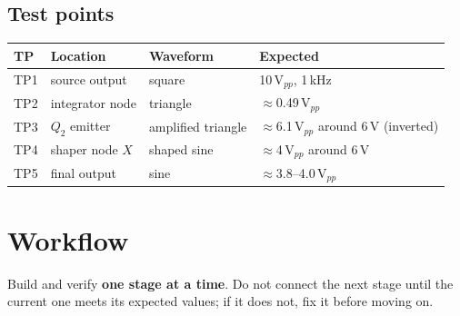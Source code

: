 \subsection{Test points}
\begin{center}
\small
\begin{tabular}{@{}llll@{}}
\toprule
TP & Location & Waveform & Expected \\
\midrule
TP1 & source output & square & 10\,V$_{pp}$, 1\,kHz \\
TP2 & integrator node & triangle & $\approx$0.49\,V$_{pp}$ \\
TP3 & $Q_2$ emitter & amplified triangle & $\approx$6.1\,V$_{pp}$ around 6\,V (inverted) \\
TP4 & shaper node $X$ & shaped sine & $\approx$4\,V$_{pp}$ around 6\,V \\
TP5 & final output & sine & $\approx$3.8--4.0\,V$_{pp}$ \\
\bottomrule
\end{tabular}
\end{center}

\section{Workflow}
Build and verify \textbf{one stage at a time}. Do not connect the next stage until the current one meets its expected values; if it does not, fix it before moving on.

